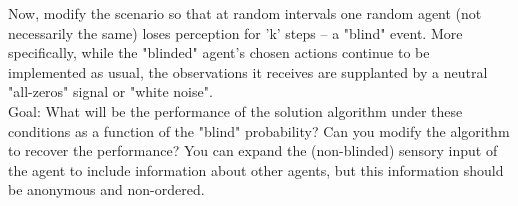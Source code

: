 \documentclass[a4paper,11pt]{article}
\begin{document}
Now, modify the scenario so that at random intervals one random agent (not necessarily the same) loses perception for 'k' steps -- a "blind" event. More specifically, while the "blinded" agent's chosen actions continue to be implemented as usual, the observations it receives are supplanted by a neutral "all-zeros" signal or "white noise".
\\
Goal: What will be the performance of the solution algorithm under these conditions as a function of the "blind" probability? Can you modify the algorithm to recover the performance? You can expand the (non-blinded) sensory input of the agent to include information about other agents, but this information should be anonymous and non-ordered. 
\end{document}
